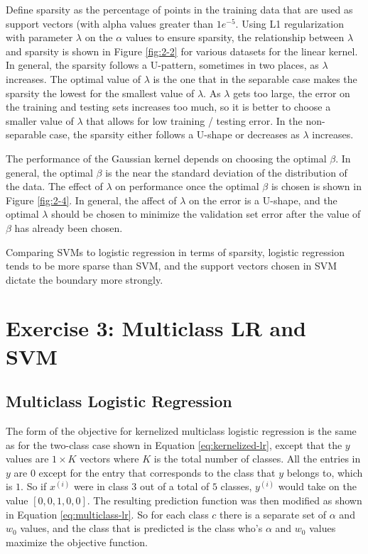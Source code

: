 \documentclass[10pt]{article}
\begin{document}
Define sparsity as the percentage of points in the training data that are used as support vectors (with alpha values greater than $1e^{-5}$. Using L1 regularization with parameter $\lambda$ on the $\alpha$ values to ensure sparsity, the relationship between $\lambda$ and sparsity is shown in Figure \ref{fig:2-2} for various datasets for the linear kernel. In general, the sparsity follows a U-pattern, sometimes in two places, as $\lambda$ increases. The optimal value of $\lambda$ is the one that in the separable case makes the sparsity the lowest for the smallest value of $\lambda$. As $\lambda$ gets too large, the error on the training and testing sets increases too much, so it is better to choose a smaller value of $\lambda$ that allows for low training / testing error. In the non-separable case, the sparsity either follows a U-shape or decreases as $\lambda$ increases.

The performance of the Gaussian kernel depends on choosing the optimal $\beta$. In general, the optimal $\beta$ is the near the standard deviation of the distribution of the data. The effect of $\lambda$ on performance once the optimal $\beta$ is chosen is shown in Figure \ref{fig:2-4}. In general, the affect of $\lambda$ on the error is a U-shape, and the optimal $\lambda$ should be chosen to minimize the validation set error after the value of $\beta$ has already been chosen.

Comparing SVMs to logistic regression in terms of sparsity, logistic regression tends to be more sparse than SVM, and the support vectors chosen in SVM dictate the boundary more strongly.

\section{Exercise 3: Multiclass LR and SVM}

\subsection{Multiclass Logistic Regression}

The form of the objective for kernelized multiclass logistic regression is the same as for the two-class case shown in Equation \ref{eq:kernelized-lr}, except that the $y$ values are $1 \times K$ vectors where $K$ is the total number of classes. All the entries in $y$ are $0$ except for the entry that corresponds to the class that $y$ belongs to, which is $1$. So if $x^{(i)}$ were in class $3$ out of a total of $5$ classes, $y^{(i)}$ would take on the value $[0, 0, 1, 0, 0]$. The resulting prediction function was then modified as shown in Equation \ref{eq:multiclass-lr}. So for each class $c$ there is a separate set of $\alpha$ and $w_0$ values, and the class that is predicted is the class who's $\alpha$ and $w_0$ values maximize the objective function.
\end{document}
